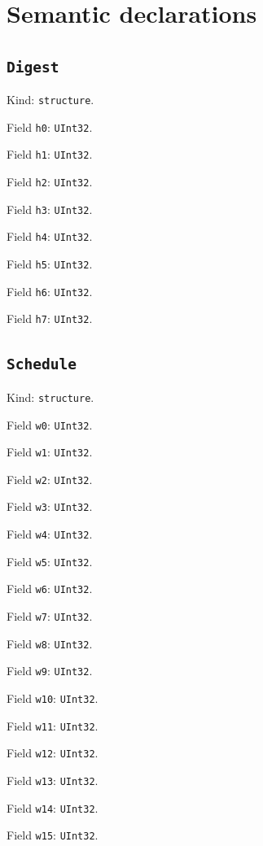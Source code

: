 \documentclass[11pt]{article}
\begin{document}
\section*{Semantic declarations}
\subsection*{\texttt{Digest}}
\noindent Kind: \texttt{structure}.\par
\noindent Field \texttt{h0}: \texttt{UInt32}.\par
\noindent Field \texttt{h1}: \texttt{UInt32}.\par
\noindent Field \texttt{h2}: \texttt{UInt32}.\par
\noindent Field \texttt{h3}: \texttt{UInt32}.\par
\noindent Field \texttt{h4}: \texttt{UInt32}.\par
\noindent Field \texttt{h5}: \texttt{UInt32}.\par
\noindent Field \texttt{h6}: \texttt{UInt32}.\par
\noindent Field \texttt{h7}: \texttt{UInt32}.\par
\subsection*{\texttt{Schedule}}
\noindent Kind: \texttt{structure}.\par
\noindent Field \texttt{w0}: \texttt{UInt32}.\par
\noindent Field \texttt{w1}: \texttt{UInt32}.\par
\noindent Field \texttt{w2}: \texttt{UInt32}.\par
\noindent Field \texttt{w3}: \texttt{UInt32}.\par
\noindent Field \texttt{w4}: \texttt{UInt32}.\par
\noindent Field \texttt{w5}: \texttt{UInt32}.\par
\noindent Field \texttt{w6}: \texttt{UInt32}.\par
\noindent Field \texttt{w7}: \texttt{UInt32}.\par
\noindent Field \texttt{w8}: \texttt{UInt32}.\par
\noindent Field \texttt{w9}: \texttt{UInt32}.\par
\noindent Field \texttt{w10}: \texttt{UInt32}.\par
\noindent Field \texttt{w11}: \texttt{UInt32}.\par
\noindent Field \texttt{w12}: \texttt{UInt32}.\par
\noindent Field \texttt{w13}: \texttt{UInt32}.\par
\noindent Field \texttt{w14}: \texttt{UInt32}.\par
\noindent Field \texttt{w15}: \texttt{UInt32}.\par
\end{document}

